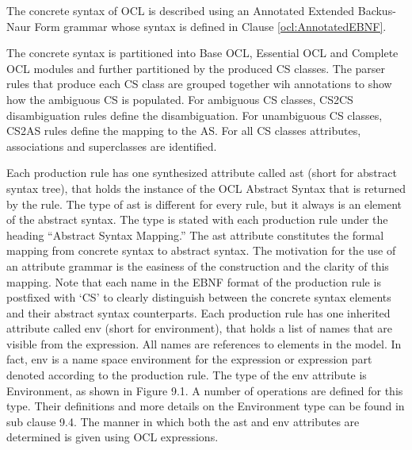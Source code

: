 \documentclass{scrreprt}   %
\begin{document}
\label{ocl:ConcreteSyntax:Structure}
The concrete syntax of OCL is described using an Annotated Extended Backus-Naur Form grammar whose syntax is defined in Clause \ref{ocl:AnnotatedEBNF}.

The concrete syntax is partitioned into Base OCL, Essential OCL and Complete OCL modules and further partitioned by the produced CS classes. The parser rules that produce each CS class are grouped together wih annotations to show how the ambiguous CS is populated. For ambiguous CS classes, CS2CS disambiguation rules define the disambiguation. For unambiguous CS classes, CS2AS rules define the mapping to the AS. For all CS classes attributes, associations and superclasses are identified.

Each production rule has one synthesized attribute called ast (short for abstract syntax tree), that holds the instance of the
OCL Abstract Syntax that is returned by the rule. The type of ast is different for every rule, but it always is an element of
the abstract syntax. The type is stated with each production rule under the heading “Abstract Syntax Mapping.” The ast
attribute constitutes the formal mapping from concrete syntax to abstract syntax.
The motivation for the use of an attribute grammar is the easiness of the construction and the clarity of this mapping.
Note that each name in the EBNF format of the production rule is postfixed with ‘CS’ to clearly distinguish between the
concrete syntax elements and their abstract syntax counterparts.
Each production rule has one inherited attribute called env (short for environment), that holds a list of names that are
visible from the expression. All names are references to elements in the model. In fact, env is a name space environment
for the expression or expression part denoted according to the production rule. The type of the env attribute is
Environment, as shown in Figure 9.1. A number of operations are defined for this type. Their definitions and more details
on the Environment type can be found in sub clause 9.4. The manner in which both the ast and env attributes are
determined is given using OCL expressions.
\end{document}
